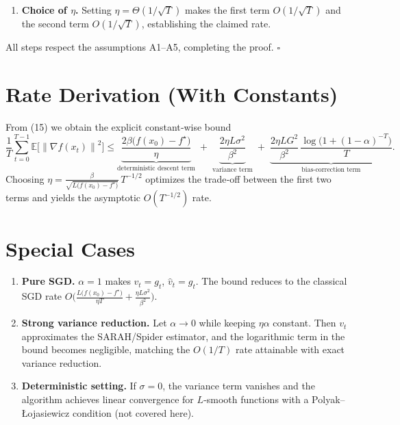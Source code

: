 \documentclass{article}
\newcommand{\E}{\mathbb{E}}
\newcommand{\norm}[1]{\left\|#1\right\|}
\newcommand{\grad}{\nabla}
\begin{document}
\begin{enumerate}[label=[Step \arabic*]]
\item \textbf{Choice of $\eta$.}  
Setting $\eta = \Theta(1/\sqrt{T})$ makes the first term $O(1/\sqrt{T})$
and the second term $O(1/\sqrt{T})$, establishing the claimed rate.
\end{enumerate}

All steps respect the assumptions A1–A5, completing the proof. \hfill$\square$

\section*{Rate Derivation (With Constants)}
From (15) we obtain the explicit constant‑wise bound
\[
\frac{1}{T}\sum_{t=0}^{T-1}\E\!\bigl[\norm{\grad f(x_t)}^2\bigr]
\le
\underbrace{\frac{2\beta\bigl(f(x_0)-f^\star\bigr)}{\eta}}_{\text{deterministic descent term}}
\;+\;
\underbrace{\frac{2\eta L\sigma^2}{\beta^2}}_{\text{variance term}}
\;+\;
\underbrace{\frac{2\eta L G^2}{\beta^2}\,
\frac{\log\!\bigl(1+(1-\alpha)^{-T}\bigr)}{T}}_{\text{bias‑correction term}} .
\]
Choosing $\eta = \frac{\beta}{\sqrt{L\bigl(f(x_0)-f^\star\bigr)} }\,T^{-1/2}$
optimizes the trade‑off between the first two terms and yields the
asymptotic $O(T^{-1/2})$ rate.

\section*{Special Cases}
\begin{enumerate}[label=\arabic*.]
\item \textbf{Pure SGD.} $\alpha=1$ makes $v_t=g_t$, $\hat v_t=g_t$.
The bound reduces to the classical SGD rate
$O\!\bigl(\frac{L\bigl(f(x_0)-f^\star\bigr)}{\eta T}
+ \frac{\eta L\sigma^2}{\beta^2}\bigr)$.

\item \textbf{Strong variance reduction.} Let $\alpha\to0$ while keeping
$\eta\alpha$ constant. Then $v_t$ approximates the SARAH/Spider estimator,
and the logarithmic term in the bound becomes negligible,
matching the $O(1/T)$ rate attainable with exact variance reduction.

\item \textbf{Deterministic setting.} If $\sigma=0$, the variance term vanishes
and the algorithm achieves linear convergence for $L$‑smooth functions
with a Polyak–Łojasiewicz condition (not covered here).
\end{enumerate}
\end{document}
